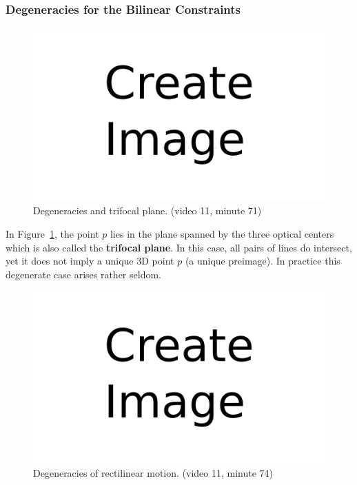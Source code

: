 \subsubsection*{Degeneracies for the Bilinear Constraints}%
\label{ssub:degeneracies_for_the_bilinear_constraints}


\begin{figure}[h]
	\centering
	\includegraphics[width=\linewidth]{img/todo.png}
	\caption{Degeneracies and trifocal plane. (video 11, minute 71)}%
	\label{fig:degeneracies_trifocal_plane}
\end{figure}

In Figure~\ref{fig:degeneracies_trifocal_plane},
the point $p$ lies in the plane spanned by
the three optical centers which is also called the \textbf{trifocal plane}.
In this case, all pairs of lines do intersect, yet it does not imply
a unique 3D point $p$ (a unique preimage).
In practice this degenerate case arises rather seldom.


\begin{figure}[h]
	\centering
	\includegraphics[width=\linewidth]{img/todo.png}
	\caption{Degeneracies of rectilinear motion. (video 11, minute 74)}%
	\label{fig:degeneracies_rectilinear_motion}
\end{figure}

